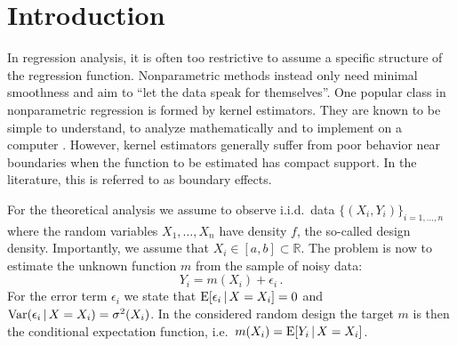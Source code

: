 


\section{Introduction}

In regression analysis, it is often too restrictive to assume a specific structure of the regression function.
Nonparametric methods instead only need minimal smoothness and aim to \enquote{let the data speak for themselves}.
One popular class in nonparametric regression is formed by kernel estimators.
They are known to be simple to understand, to analyze mathematically and to implement on a computer \parencite{Ruppert_1994}.
However, kernel estimators generally suffer from poor behavior near boundaries when the function to be estimated has compact support.
In the literature, this is referred to as boundary effects.

For the theoretical analysis we assume to observe i.i.d.\ data $\{(X_i, Y_i)\}_{i = 1, \dots, n}$
where the random variables $X_1, \dots, X_n$ have density $f$, the so-called design density.
Importantly, we assume that $X_i \in [a, b] \subset \mathbb{R}$.
The problem is now to estimate the unknown function $m$ from the sample of noisy data:
\begin{equation}
	Y_i = m(X_i) + \epsilon_i \,.
\end{equation}
For the error term $\epsilon_i$ we state that $\operatorname{E}[\epsilon_i \,|\, X = X_i] = 0$ and $\operatorname{Var}(\epsilon_i \,|\, X = X_i) = \sigma^2(X_i)$.
In the considered random design the target $m$ is then the conditional expectation function, i.e.\ $m(X_i) = \operatorname{E}[Y_i \,|\, X = X_i]$.

